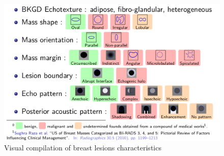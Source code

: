 \begin{figure}[htpb]
  \centering
  \includegraphics[width=0.9\linewidth]{doc}
  \caption{Visual compilation of breast lesions characteristics}
  \label{fig:lesions}
\end{figure}

%

